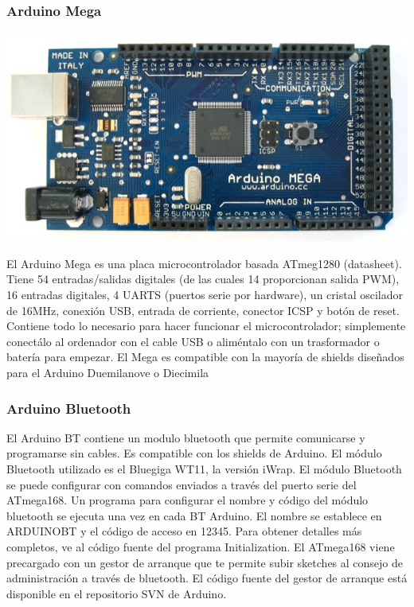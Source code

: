 \documentclass[12pt,a4paper]{report}
\begin{document}
\subsubsection{Arduino Mega}

\includegraphics[scale=0.6]{ArduinoMega.jpg}

El Arduino Mega es una placa microcontrolador basada ATmeg1280 (datasheet). Tiene 54 entradas/salidas digitales (de las cuales 14 proporcionan salida PWM), 16 entradas digitales, 4 UARTS (puertos serie por hardware), un cristal oscilador de 16MHz, conexión USB, entrada de corriente, conector ICSP y botón de reset. Contiene todo lo necesario para hacer funcionar el microcontrolador; simplemente conectálo al ordenador con el cable USB o aliméntalo con un trasformador o batería para empezar. El Mega es compatible con la mayoría de shields diseñados para el Arduino Duemilanove o Diecimila

\subsubsection{Arduino Bluetooth}

El Arduino BT contiene un modulo bluetooth que permite comunicarse y programarse
sin cables. Es compatible con los shields de Arduino. 
El módulo Bluetooth utilizado es el Bluegiga WT11, la versión iWrap. El módulo
Bluetooth se puede configurar con comandos enviados a través del puerto serie
del ATmega168. Un programa para configurar el nombre y código del módulo
bluetooth se ejecuta una vez en cada BT Arduino. El nombre se establece en
ARDUINOBT y el código de acceso en 12345. Para obtener detalles más completos,
ve al código fuente del programa Initialization. El ATmega168 viene precargado
con un gestor de arranque que te permite subir sketches al consejo de
administración a través de bluetooth. El código fuente del gestor de arranque
está disponible en el repositorio SVN de Arduino.
\end{document}
